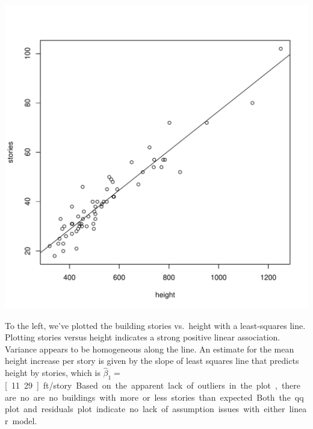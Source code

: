 \documentclass{homework}
\begin{document}
\begin{solution}
\begin{minipage}{.3\textwidth}
\includegraphics[width=\textwidth]{height_vs_stories.pdf}
\end{minipage}
\begin{minipage}{.6\textwidth}
To the left, we've plotted the building stories vs.~height with a least-squares
line.  Plotting stories versus height indicates a strong positive linear
association.  Variance appears to be homogeneous along the line.  An estimate
for the mean height increase per story is given by the slope of least squares
line that predicts height by stories, which is $\hat \beta_1 =$
\unit[11.29]{ft/story}.  Based on the apparent lack of outliers in the plot,
there are no are no buildings with more or less stories than expected.
Both the qqplot and residuals plot indicate no lack of assumption issues
with either linear model.
\end{minipage}


\end{solution}
\end{document}

